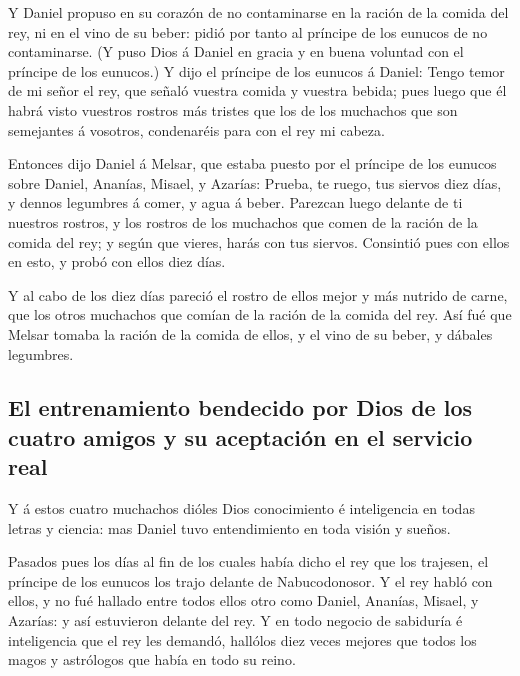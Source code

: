  Y Daniel propuso en su corazón de no contaminarse en la
ración de la comida del rey, ni en el vino de su beber: pidió por tanto
al príncipe de los eunucos de no contaminarse.  (Y puso Dios
á Daniel en gracia y en buena voluntad con el príncipe de los eunucos.)
 Y dijo el príncipe de los eunucos á Daniel: Tengo temor de
mi señor el rey, que señaló vuestra comida y vuestra bebida; pues luego
que él habrá visto vuestros rostros más tristes que los de los muchachos
que son semejantes á vosotros, condenaréis para con el rey mi cabeza.

 Entonces dijo Daniel á Melsar, que estaba puesto por el
príncipe de los eunucos sobre Daniel, Ananías, Misael, y Azarías:
 Prueba, te ruego, tus siervos diez días, y dennos
legumbres á comer, y agua á beber.  Parezcan luego delante
de ti nuestros rostros, y los rostros de los muchachos que comen de la
ración de la comida del rey; y según que vieres, harás con tus siervos.
 Consintió pues con ellos en esto, y probó con ellos diez
días.

 Y al cabo de los diez días pareció el rostro de ellos
mejor y más nutrido de carne, que los otros muchachos que comían de la
ración de la comida del rey.  Así fué que Melsar tomaba la
ración de la comida de ellos, y el vino de su beber, y dábales
legumbres.

\hypertarget{el-entrenamiento-bendecido-por-dios-de-los-cuatro-amigos-y-su-aceptaciuxf3n-en-el-servicio-real}{%
\subsection{El entrenamiento bendecido por Dios de los cuatro amigos y
su aceptación en el servicio
real}\label{el-entrenamiento-bendecido-por-dios-de-los-cuatro-amigos-y-su-aceptaciuxf3n-en-el-servicio-real}}

 Y á estos cuatro muchachos dióles Dios conocimiento é
inteligencia en todas letras y ciencia: mas Daniel tuvo entendimiento en
toda visión y sueños.

 Pasados pues los días al fin de los cuales había dicho el
rey que los trajesen, el príncipe de los eunucos los trajo delante de
Nabucodonosor.  Y el rey habló con ellos, y no fué hallado
entre todos ellos otro como Daniel, Ananías, Misael, y Azarías: y así
estuvieron delante del rey.  Y en todo negocio de sabiduría
é inteligencia que el rey les demandó, hallólos diez veces mejores que
todos los magos y astrólogos que había en todo su reino.

